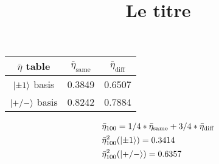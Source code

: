 \documentclass[a4paper]{article}
\title{Le titre}
\begin{document}
\centering
\begin{tabular}{ccc}

\hline
$\bar{\eta}$ table & $\bar{\eta}_\textrm{same}$ & $\bar{\eta}_\textrm{diff}$ \\
\hline
$\ket{\pm 1}$ basis & 0.3849 & 0.6507 \\
$\ket{+/-}$ basis & 0.8242 & 0.7884 \\
\hline
\end{tabular}
\begin{align*}
&\bar{\eta}_{100}=1/4*\bar{\eta}_\textrm{same}+3/4*\bar{\eta}_\textrm{diff} \\
&\bar{\eta}^2_{100}(\ket{\pm 1})=0.3414 \\
&\bar{\eta}^2_{100}(\ket{+/-})=0.6357
\end{align*}
\end{document}

